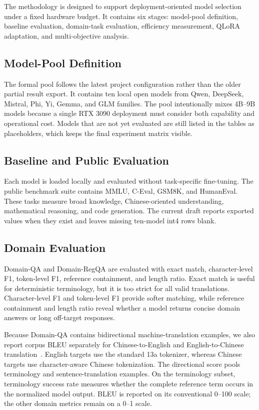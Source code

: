 \label{sec:methodology}

The methodology is designed to support deployment-oriented model selection
under a fixed hardware budget. It contains six stages: model-pool definition,
baseline evaluation, domain-task evaluation, efficiency measurement, QLoRA
adaptation, and multi-objective analysis.

\subsection{Model-Pool Definition}

The formal pool follows the latest project configuration rather than the older
partial result export. It contains ten local open models from Qwen, DeepSeek,
Mistral, Phi, Yi, Gemma, and GLM families. The pool intentionally mixes 4B--9B
models because a single RTX 3090 deployment must consider both capability and
operational cost. Models that are not yet evaluated are still listed in the
tables as placeholders, which keeps the final experiment matrix visible.

\subsection{Baseline and Public Evaluation}

Each model is loaded locally and evaluated without task-specific fine-tuning.
The public benchmark suite contains MMLU, C-Eval, GSM8K, and HumanEval. These
tasks measure broad knowledge, Chinese-oriented understanding, mathematical
reasoning, and code generation. The current draft reports exported values when
they exist and leaves missing ten-model int4 rows blank.

\subsection{Domain Evaluation}

Domain-QA and Domain-RegQA are evaluated with exact match, character-level F1,
token-level F1, reference containment, and length ratio. Exact match is useful
for deterministic terminology, but it is too strict for all valid translations.
Character-level F1 and token-level F1 provide softer matching, while reference
containment and length ratio reveal whether a model returns concise domain
answers or long off-target responses.

Because Domain-QA contains bidirectional machine-translation examples, we also
report corpus BLEU separately for Chinese-to-English and English-to-Chinese
translation~\cite{papineni2002bleu}. English targets use the standard 13a
tokenizer, whereas Chinese targets use character-aware Chinese tokenization.
The directional score pools terminology and sentence-translation examples. On
the terminology subset, terminology success rate measures whether the complete
reference term occurs in the normalized model output. BLEU is reported on its
conventional 0--100 scale; the other domain metrics remain on a 0--1 scale.

